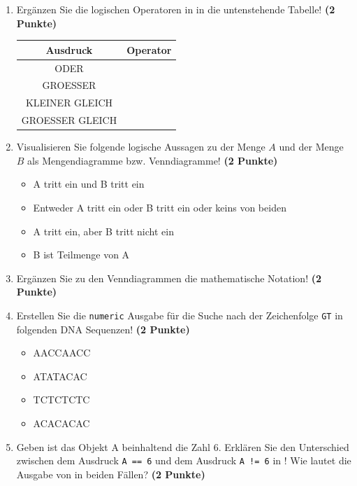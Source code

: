 \documentclass[a4paper, 10pt]{scrartcl}\usepackage[]{graphicx}\usepackage[]{xcolor}
\begin{document}
\begin{enumerate}
\item Erg{\"a}nzen Sie die logischen Operatoren in \Rlogo in die untenstehende Tabelle!
  \textbf{(2 Punkte)}
  \begin{center}
    \begin{tabular}{c|c}
      \textbf{Ausdruck} & \textbf{Operator} \strut\\ \hline
      ODER  & \phantom{ODER}\strut\\ \hline
      GROESSER  & \phantom{GROESSER}\strut\\ \hline
      KLEINER GLEICH  & \phantom{KLEINER GLEICH}\strut\\ \hline
      GROESSER GLEICH  & \phantom{GROESSER GLEICH}\strut\\ 
    \end{tabular}
  \end{center}  
\item Visualisieren Sie folgende logische Aussagen zu der Menge $A$ und der Menge
  $B$ als Mengendiagramme bzw. Venndiagramme!
  \textbf{(2 Punkte)}
  \begin{itemize}
  \item A tritt ein und B tritt ein
  \item Entweder A tritt ein oder B tritt ein oder keins von beiden
  \item A tritt ein, aber B tritt nicht ein
  \item B ist Teilmenge von A
  \end{itemize}
\item Erg{\"a}nzen Sie zu den Venndiagrammen die mathematische Notation!
  \textbf{(2 Punkte)}
\item Erstellen Sie die \texttt{numeric} \Rlogo Ausgabe f{\"u}r die
  Suche nach der Zeichenfolge \texttt{GT} in folgenden DNA
  Sequenzen! \textbf{(2 Punkte)}
  \begin{itemize}
  \item AACCAACC
  \item ATATACAC
  \item TCTCTCTC
  \item ACACACAC
  \end{itemize}
\item Geben ist das \Rlogo Objekt A beinhaltend die Zahl
  6. Erkl{\"a}ren Sie den Unterschied zwischen dem Ausdruck \texttt{A == 6}
  und dem Ausdruck \texttt{A != 6} in \Rlogo! Wie lautet die Ausgabe von \Rlogo
  in beiden F{\"a}llen? \textbf{(2 Punkte)}
\end{enumerate}
\end{document}
